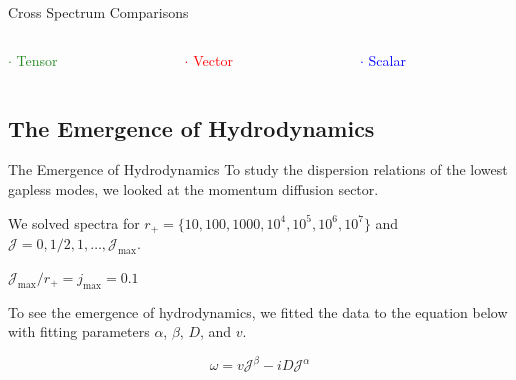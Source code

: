 \documentclass[aspectratio=169, xcolor=dvipsnames]{beamer}
\begin{document}
\begin{frame}{Cross Spectrum Comparisons}
  \vfill

  \begin{columns}[c]
    \begin{column}{0.33\textwidth}
      \textcolor{ForestGreen}{$\cdot$ Tensor}
    \end{column}

    \begin{column}{0.33\textwidth}
      \textcolor{red}{$\cdot$ Vector}
    \end{column}

    \begin{column}{0.33\textwidth}
      \textcolor{blue}{$\cdot$ Scalar}
    \end{column}
  \end{columns}
\end{frame}

\subsection{The Emergence of Hydrodynamics}

\begin{frame}{The Emergence of Hydrodynamics}
  To study the dispersion relations of the lowest gapless modes, we looked
  at the momentum diffusion sector.

  \vfill

  We solved spectra for
  \(r_+ = \{10, 100, 1000, 10^4 , 10^5 , 10^6 , 10^7 \}\) and
  \(\mathcal J = 0, 1/2, 1, \ldots, \mathcal J_\mathrm{max}\).

  \begin{alertblock}{}
    {\(\mathcal J_\mathrm{max}/r_+ = \mathit j_\mathrm{max} = 0.1\)}
  \end{alertblock}

  \vfill

  To see the emergence of hydrodynamics, we fitted the data to the
  equation below with fitting parameters \(\alpha\), \(\beta\), \(D\), and
  \(v\).

  \vfill

  \begin{equation*}
    \omega = v \mathcal J^\beta - i D \mathcal J^\alpha
  \end{equation*}
\end{frame}
\end{document}
